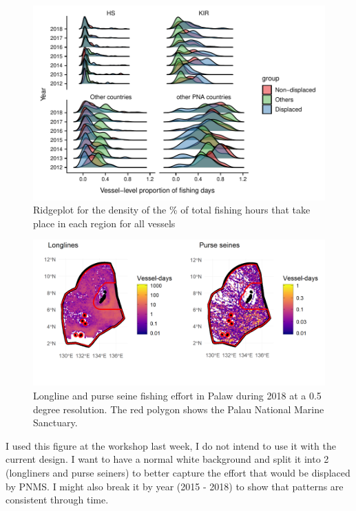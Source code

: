 \documentclass[12pt]{article}
\begin{document}
\begin{figure}
\centering
	\includegraphics{img/yearly_distribution_prop_fishing_by_region.pdf}
	\caption{\label{fig:yearly_distribution_prop_fishing_by_region}Ridgeplot for the density of the \% of total fishing hours that take place in each region for all vessels}	
\end{figure}

\clearpage

\begin{figure}
\centering
\includegraphics{img/plw_2018.png}
\caption{\label{fig:plw_2018}Longline and purse seine fishing effort in Palaw during 2018 at a 0.5 degree resolution. The red polygon shows the Palau National Marine Sanctuary.}
\end{figure}

I used this figure at the workshop last week, I do not intend to use it with the current design. I want to have a normal white background and split it into 2 (longliners and purse seiners) to better capture the effort that would be displaced by PNMS. I might also break it by year (2015 - 2018) to show that patterns are consistent through time.
\end{document}
